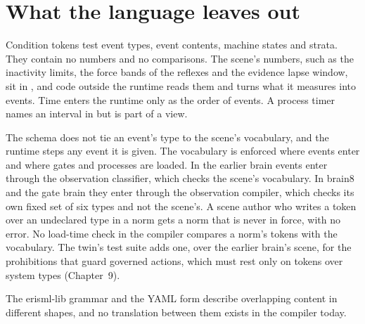 \section{What the language leaves out}\label{sec:erisml-limits}

Condition tokens test event types, event contents, machine states and strata. They contain no
numbers and no comparisons. The scene's numbers, such as the inactivity limits, the force bands of the
reflexes and the evidence lapse window, sit in , and code outside the runtime reads them
and turns what it measures into events. Time enters the runtime only as the order of events. A
process timer names an interval in  but is part of a view.

The schema does not tie an event's type to the scene's vocabulary, and the runtime steps any event it
is given. The vocabulary is enforced where events enter and where gates and processes are loaded.
In the earlier brain events enter through the observation classifier, which checks the scene's
vocabulary. In brain8 and the gate brain they enter through the observation compiler, which checks its
own fixed set of six types and not the scene's.
A scene author who writes a token over an undeclared type in a norm gets a norm that is never in force, with no error. No load-time check in the compiler compares a
norm's tokens with the vocabulary. The twin's test suite adds one, over the earlier brain's scene,
for the prohibitions that guard governed actions, which must rest only on tokens over system types (Chapter~9).

The erisml-lib grammar and the YAML form describe overlapping content in different shapes, and no
translation between them exists in the compiler today.
